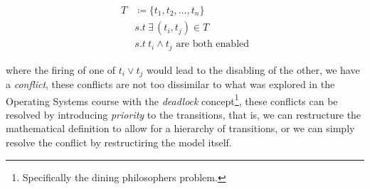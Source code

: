 \documentclass[openright, twoside, twocolumn]{report}
\begin{document}
  \begin{align}
    T &\coloneqq  \{ t_1, t_2, \ldots, t_n \}\\
    &s.t \ \exists\, (t_i, t_j) \in T \\
    &s.t \ t_i \land  t_j \text{ are both enabled}
  \end{align}

    where the firing of one of $t_i \lor t_j$ would lead to the disabling of 
    the other, we have a \emph{conflict}, these conflicts are not too dissimilar to what was explored in the 
    Operating Systems course with the \emph{deadlock} concept\footnote{
      Specifically the dining philosophers problem.
    }, these conflicts can be resolved by introducing \emph{priority} to the transitions, that is, we can
    restructure the mathematical definition to allow for a hierarchy of transitions, or we can simply resolve 
    the conflict by restructiring the model itself.
\end{document}
